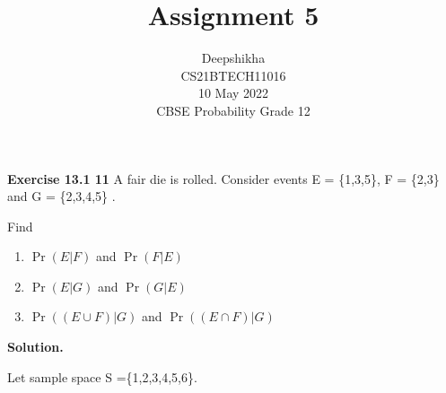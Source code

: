 \documentclass[journal,12pt,twocolumn]{IEEEtran}
\title{Assignment 5 }
\author{Deepshikha \\ \normalsize CS21BTECH11016 \\ \vspace*{20pt} \normalsize  10 May 2022 \\ \vspace*{20pt} \Large CBSE Probability Grade 12}
\providecommand{\pr}[1]{\ensuremath{\Pr\left(#1\right)}}
\begin{document}
	\maketitle
	
	\textbf{Exercise 13.1 11} 
	A fair die is rolled. Consider events E = \{1,3,5\}, F = \{2,3\} and G = \{2,3,4,5\} .
	
	Find
	
	
	\begin{enumerate}[label=(\roman*)]
	\item \pr{E|F} and \pr{F|E}
	\item \pr{E|G} and \pr{G|E}
	\item \pr{(E \cup F)|G} and \pr{(E \cap F)|G}
	\end{enumerate}	 
	
	\textbf{Solution.}
	
	
	Let sample space S =\{1,2,3,4,5,6\}.
	
\end{document}
